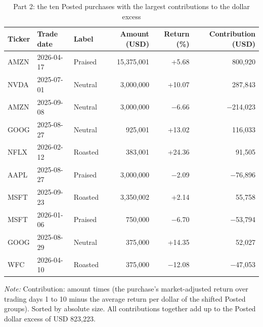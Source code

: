 \begin{table}[htbp]
\centering
\small
\setlength{\tabcolsep}{4pt}
\caption{Part 2: the ten Posted purchases with the largest contributions to the dollar excess}
\label{tab:contributors}
\begin{tabular}{lllrrr}
\toprule
Ticker & Trade date & Label & Amount (USD) & Return (\%) & Contribution (USD) \\
\midrule
AMZN & 2026-04-17 & Praised & 15,375,001 & +5.68 & 800,920 \\
NVDA & 2025-07-01 & Neutral & 3,000,000 & +10.07 & 287,843 \\
AMZN & 2025-09-08 & Neutral & 3,000,000 & $-$6.66 & $-$214,023 \\
GOOG & 2025-08-27 & Neutral & 925,001 & +13.02 & 116,033 \\
NFLX & 2026-02-12 & Roasted & 383,001 & +24.36 & 91,505 \\
AAPL & 2025-08-27 & Praised & 3,000,000 & $-$2.09 & $-$76,896 \\
MSFT & 2025-09-23 & Roasted & 3,350,002 & +2.14 & 55,758 \\
MSFT & 2026-01-06 & Praised & 750,000 & $-$6.70 & $-$53,794 \\
GOOG & 2025-08-29 & Neutral & 375,000 & +14.35 & 52,027 \\
WFC & 2026-04-10 & Roasted & 375,000 & $-$12.08 & $-$47,053 \\
\bottomrule
\end{tabular}
\par\medskip
\begin{minipage}{\linewidth}\footnotesize\textit{Note:} Contribution: amount times (the purchase's market-adjusted return over trading days 1 to 10 minus the average return per dollar of the shifted Posted groups). Sorted by absolute size. All contributions together add up to the Posted dollar excess of USD 823,223.\end{minipage}
\end{table}
